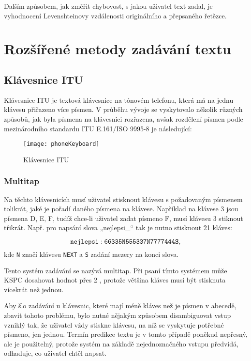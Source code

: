 \documentclass[a4paper,11pt]{article}
\begin{document}
Dalším způsobem, jak změřit chybovost, s jakou uživatel text zadal, je vyhodnocení Levenshteinovy vzdálenosti originálního a přepsaného řetězce. %

\section{Rozšířené metody zadávání textu}

\subsection{Klávesnice ITU}\label{itu-kb}

Klávesnice ITU je textová klávesnice na tónovém telefonu, která má na jednu klávesu přiřazeno více písmen. V průběhu vývoje se vyskytovalo několik různých způsobů, jak byla písmena na klávesnici rozřazena, avšak rozdělení písmen podle mezinárodního standardu ITU E.161/ISO 9995-8 \cite{mfmtlqoxL48pMk3T} je následující: %

\begin{figure}[h]
	\centering
	\texttt{[image: phoneKeyboard]}
	\caption{Klávesnice ITU}
	\label{fig:phoneKeyboard}
\end{figure}

\subsubsection{Multitap}

Na těchto klávesnicích musí uživatel stisknout klávesu s požadovaným písmenem tolikrát, jaké je pořadí daného písmena na klávese. Například na klávese 3 jsou písmena D, E, F, tudíž chce-li uživatel zadat písmeno F, musí klávesu 3 stiknout třikrát. Např. pro napsání slova „nejlepsi\_“ tak je nutno stisknout 21 kláves:

\[
	{\tt nejlepsi: 66335N555337N7777444S},
\]
kde {\tt N} značí klávesu {\tt NEXT} a {\tt S} zadání mezery na konci slova.

Tento systém zadávání se nazývá multitap. Při psaní tímto systémem může KSPC dosahovat hodnot přes 2 \cite{dXVv6nPb2KifFXYv}, protože většina kláves musí být stisknuta vícekrát než jednou. 

Aby šlo zadávání u klávesnic, které mají méně kláves než je písmen v abecedě, zbavit tohoto problému, bylo nutné nějakým způsobem disambiguovat vstup vzniklý tak, že uživatel vždy stiskne klávesu, na níž se vyskytuje potřebné písmeno, jen jednou. Termín predikce textu je v tomto případě poněkud nepřesný, ale je použitelný, protože systém na základě nejednoznačného vstupu předvídá, odhaduje, co uživatel chtěl napsat.
\end{document}
